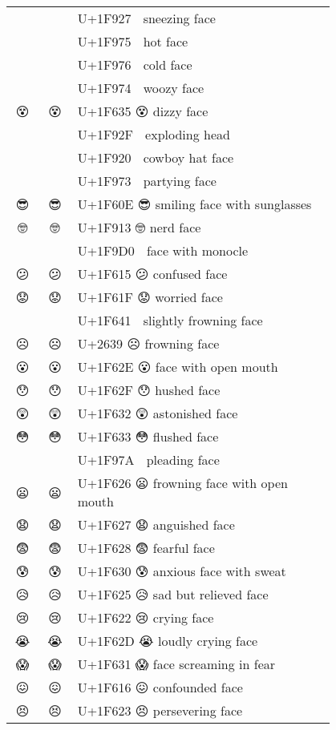\documentclass[a4paper,12pt]{article}
\newcommand{\fontA}[1]{{\fontspec[RawFeature={mode=harf,+dist,+ccmp}]{Segoe UI Emoji} #1}}
\newcommand{\fontB}[1]{{\fontspec[RawFeature={mode=harf,+dist,+ccmp}]{Noto Color Emoji} #1}}
\begin{document}
\begin{longtable}[c]{ccp{0.8\linewidth}}
\fontA{🤧}&\fontB{🤧}&U+1F927 🤧 sneezing face\\
\fontA{🥵}&\fontB{🥵}&U+1F975 🥵 hot face\\
\fontA{🥶}&\fontB{🥶}&U+1F976 🥶 cold face\\
\fontA{🥴}&\fontB{🥴}&U+1F974 🥴 woozy face\\
\fontA{😵}&\fontB{😵}&U+1F635 😵 dizzy face\\
\fontA{🤯}&\fontB{🤯}&U+1F92F 🤯 exploding head\\
\fontA{🤠}&\fontB{🤠}&U+1F920 🤠 cowboy hat face\\
\fontA{🥳}&\fontB{🥳}&U+1F973 🥳 partying face\\
\fontA{😎}&\fontB{😎}&U+1F60E 😎 smiling face with sunglasses\\
\fontA{🤓}&\fontB{🤓}&U+1F913 🤓 nerd face\\
\fontA{🧐}&\fontB{🧐}&U+1F9D0 🧐 face with monocle\\
\fontA{😕}&\fontB{😕}&U+1F615 😕 confused face\\
\fontA{😟}&\fontB{😟}&U+1F61F 😟 worried face\\
\fontA{🙁}&\fontB{🙁}&U+1F641 🙁 slightly frowning face\\
\fontA{☹}&\fontB{☹}&U+2639 ☹ frowning face\\
\fontA{😮}&\fontB{😮}&U+1F62E 😮 face with open mouth\\
\fontA{😯}&\fontB{😯}&U+1F62F 😯 hushed face\\
\fontA{😲}&\fontB{😲}&U+1F632 😲 astonished face\\
\fontA{😳}&\fontB{😳}&U+1F633 😳 flushed face\\
\fontA{🥺}&\fontB{🥺}&U+1F97A 🥺 pleading face\\
\fontA{😦}&\fontB{😦}&U+1F626 😦 frowning face with open mouth\\
\fontA{😧}&\fontB{😧}&U+1F627 😧 anguished face\\
\fontA{😨}&\fontB{😨}&U+1F628 😨 fearful face\\
\fontA{😰}&\fontB{😰}&U+1F630 😰 anxious face with sweat\\
\fontA{😥}&\fontB{😥}&U+1F625 😥 sad but relieved face\\
\fontA{😢}&\fontB{😢}&U+1F622 😢 crying face\\
\fontA{😭}&\fontB{😭}&U+1F62D 😭 loudly crying face\\
\fontA{😱}&\fontB{😱}&U+1F631 😱 face screaming in fear\\
\fontA{😖}&\fontB{😖}&U+1F616 😖 confounded face\\
\fontA{😣}&\fontB{😣}&U+1F623 😣 persevering face\\

\end{longtable}
\end{document}
